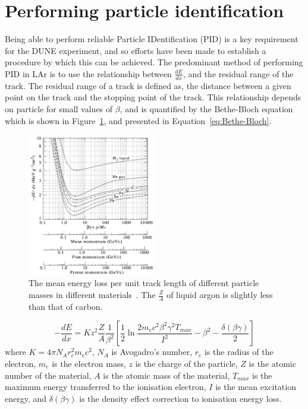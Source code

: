 \section{Performing particle identification}  \label{sec:PID} %
Being able to perform reliable Particle IDentification (PID) is a key requirement for the DUNE experiment, and so efforts have been made to establish a procedure by which this can be achieved. The predominant method of performing PID in LAr is to use the relationship between $\frac{dE}{dx}$, and the residual range of the track. The residual range of a track is defined as, the distance between a given point on the track and the stopping point of the track. This relationship depends on particle for small values of $\beta$, and is quantified by the Bethe-Bloch equation~\citep{Bethe, Bloch} which is shown in Figure~\ref{fig:BetheBloch}, and presented in Equation~\ref{eq:Bethe-Bloch}. \\

\begin{figure}
  \centering
  \includegraphics[width=0.5\textwidth]{Bethe-Bloch}
  \caption[The mean energy loss per unit track length of different particle masses in different materials]
          {The mean energy loss per unit track length of different particle masses in different materials~\citep{PDGReview}. The $\frac{Z}{A}$ of liquid argon is slightly less than that of carbon.}
  \label{fig:BetheBloch}
\end{figure}

\begin{equation}
  \label{eq:Bethe-Bloch}
  -\frac{dE}{dx} = K z^2 \frac{Z}{A} \frac{1}{\beta^2} \left[ \frac{1}{2} \ln{\frac{2 m_e c^2 \beta^2 \gamma^2 T_{max}}{I^2}} - \beta^2 - \frac{\delta(\beta\gamma)}{2}\right]
\end{equation}
where $K = 4 \pi N_A r_{e}^{2} m_e c^2$, $N_A$ is Avogadro's number, $r_e$ is the radius of the electron, $m_e$ is the electron mass, $z$ is the charge of the particle, $Z$ is the atomic number of the material, $A$ is the atomic mass of the material, $T_{max}$ is the maximum energy transferred to the ionisation electron, $I$ is the mean excitation energy, and $\delta(\beta\gamma)$ is the density effect correction to ionisation energy loss. \\


